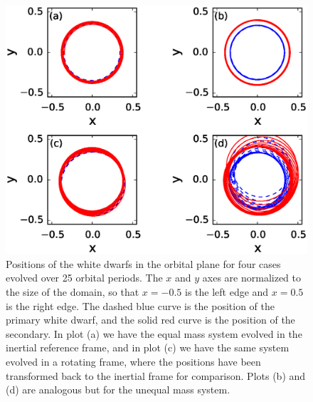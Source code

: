 \documentclass[iop,numberedappendix]{../emulateapj}
\begin{document}
\begin{figure}
  \centering
  \includegraphics[scale=0.7]{plots/circular_orbit_comparison}
  \caption{Positions of the white dwarfs in the orbital plane for four
    cases evolved over 25 orbital periods.  The $x$ and $y$ axes are
    normalized to the size of the domain, so that $x = -0.5$ is the
    left edge and $x = 0.5$ is the right edge. The dashed blue curve
    is the position of the primary white dwarf, and the solid red
    curve is the position of the secondary. In plot (a) we have the
    equal mass system evolved in the inertial reference frame, and in
    plot (c) we have the same system evolved in a rotating frame,
    where the positions have been transformed back to the inertial
    frame for comparison.  Plots (b) and (d) are analogous but for the
    unequal mass system.\label{fig:circular_orbit_comparison}}
\end{figure}
\end{document}
